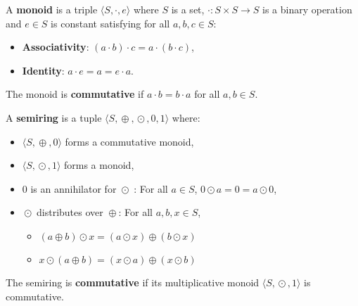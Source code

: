 \begin{definition}[Monoid]
    \label{def:monoid}
    A \textbf{monoid} is a triple \(\langle S, \cdot, e \rangle\) where \(S\) is a set, \(\cdot : S \mathop{\times} S \mathop{\to} S\) is a binary operation and \(e \mathop{\in} S\) is constant
    satisfying for all \(a, b, c \mathop{\in} S\):
    \begin{itemize}
        \item \textbf{Associativity}: \((a \cdot b) \cdot c \mathop{=} a \cdot (b \cdot c)\),
        \item \textbf{Identity}: \(a \cdot e \mathop{=} a \mathop{=} e \cdot a\).
    \end{itemize}
    The monoid is \textbf{commutative} if \(a \cdot b \mathop{=} b \cdot a\) for all \(a, b \mathop{\in} S\).
\end{definition} 

\begin{definition}[Semiring]
    \label{def:semiring}
    A \textbf{semiring} is a tuple \(\langle S, \mathop{\oplus}, \mathop{\odot}, 0, 1 \rangle\) where:
    \begin{itemize}
        \item  \(\langle S, \mathop{\oplus}, 0 \rangle\) forms a commutative monoid,
        \item  \(\langle S, \mathop{\odot}, 1 \rangle\) forms a monoid,
        \item  $0$ is an annihilator for $\mathop{\odot}$ : For all \(a \mathop{\in} S\),
              \(
                  0 \mathop{\odot} a \mathop{=} 0 \mathop{=} a \mathop{\odot} 0
              \),
        \item $\mathop{\odot}$ distributes over $\mathop{\oplus}$: For all \(a, b, x \mathop{\in} S\),
              \begin{itemize}
                \item $(a \mathop{\oplus} b) \mathop{\odot} x \mathop{=} (a \mathop{\odot} x) \mathop{\oplus} (b \mathop{\odot} x)$
                \item $x \mathop{\odot} (a \mathop{\oplus} b) \mathop{=} (x \mathop{\odot} a) \mathop{\oplus} (x \mathop{\odot} b)$
              \end{itemize}                 
    \end{itemize}
    The semiring is \textbf{commutative} if its multiplicative monoid \(\langle S, \mathop{\odot}, 1 \rangle\) is commutative.
\end{definition}


